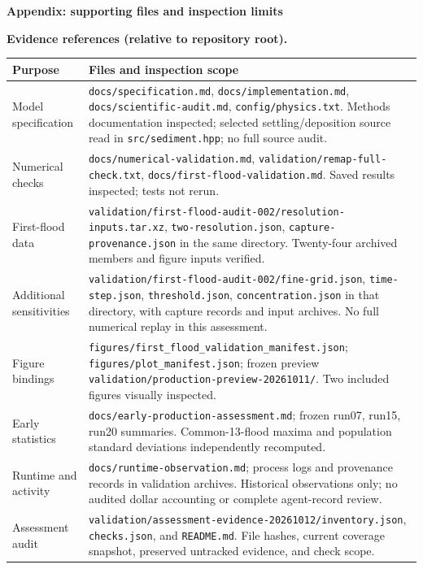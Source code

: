 \documentclass[10pt,letterpaper]{article}
\newcommand{\file}[1]{\nolinkurl{#1}}
\begin{document}
\clearpage
{\large\bfseries Appendix: supporting files and inspection limits}\par
\small
\textbf{Evidence references (relative to repository root).}\par
\begin{tabularx}{\linewidth}{>{\raggedright\arraybackslash}p{1.35in}X}\toprule
Purpose & Files and inspection scope\\\midrule
Model specification & \file{docs/specification.md}, \file{docs/implementation.md}, \file{docs/scientific-audit.md}, \file{config/physics.txt}. Methods documentation inspected; selected settling/deposition source read in \file{src/sediment.hpp}; no full source audit.\\
Numerical checks & \file{docs/numerical-validation.md}, \file{validation/remap-full-check.txt}, \file{docs/first-flood-validation.md}. Saved results inspected; tests not rerun.\\
First-flood data & \file{validation/first-flood-audit-002/resolution-inputs.tar.xz}, \file{two-resolution.json}, \file{capture-provenance.json} in the same directory. Twenty-four archived members and figure inputs verified.\\
Additional sensitivities & \file{validation/first-flood-audit-002/fine-grid.json}, \file{time-step.json}, \file{threshold.json}, \file{concentration.json} in that directory, with capture records and input archives. No full numerical replay in this assessment.\\
Figure bindings & \file{figures/first_flood_validation_manifest.json}; \file{figures/plot_manifest.json}; frozen preview \file{validation/production-preview-20261011/}. Two included figures visually inspected.\\
Early statistics & \file{docs/early-production-assessment.md}; frozen run07, run15, run20 summaries. Common-13-flood maxima and population standard deviations independently recomputed.\\
Runtime and activity & \file{docs/runtime-observation.md}; process logs and provenance records in validation archives. Historical observations only; no audited dollar accounting or complete agent-record review.\\
Assessment audit & \file{validation/assessment-evidence-20261012/inventory.json}, \file{checks.json}, and \file{README.md}. File hashes, current coverage snapshot, preserved untracked evidence, and check scope.\\\bottomrule
\end{tabularx}
\end{document}
